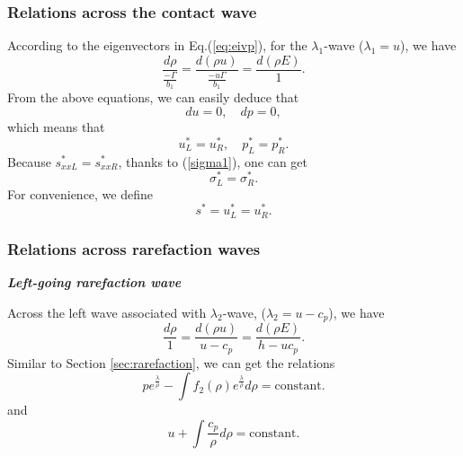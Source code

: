\documentclass{article}
\numberwithin{equation}{section}
\numberwithin{table}{section}
\begin{document}
\subsubsection{Relations across the contact wave}\label{sec:contactp}

According to  the eigenvectors in  Eq.(\ref{eq:eivp}), for the $\lambda_{1}$-wave ($\lambda_1 = u$), we
have
\begin{equation}   \label{e232a}
  \frac{d \rho}{\frac{-\Gamma}{b_1}} = \frac{d (\rho u)}{\frac{-u\Gamma}{b_1}} = \frac{d (\rho E)}{1}.
\end{equation}
From the above equations, we can easily deduce that
\begin{equation*}
  du = 0, \quad dp = 0,
\end{equation*}
which means that
\begin{equation*}
u_L^* = u_R^*, %
 \quad
  p^*_L = p^*_R.
\end{equation*}
Because $s^*_{xxL} = s^*_{xxR}$, thanks to (\ref{sigma1}), one can get
\begin{equation*}
  \sigma^*_L = \sigma^*_R.
\end{equation*}
For convenience, we define
\begin{equation*}
  s^* = u_L^* = u_R^*.
\end{equation*}

\subsubsection{Relations across rarefaction waves}

\emph{\textbf{Left-going rarefaction wave} }

Across the left wave associated with $\lambda_2$-wave, ($\lambda_2=u-c_p$), we have
\begin{equation}
  \frac{d\rho}{1} = \frac{d(\rho u)}{u-c_p} = \frac{d(\rho E)}{h-uc_p}.
\end{equation}
Similar to Section \ref{sec:rarefaction}, we can get the relations
\begin{equation}\label{eq:p_rhopL}
  p e^{\frac{\lambda}{\rho}} - \int f_2(\rho) e^{\frac{\lambda}{\rho}}d\rho = \text{constant}.
\end{equation}
and
\begin{equation}\label{eq:u_rhopL}
  u+\int\frac{c_p}{\rho} d\rho = \text{constant}.
\end{equation}
\end{document}

